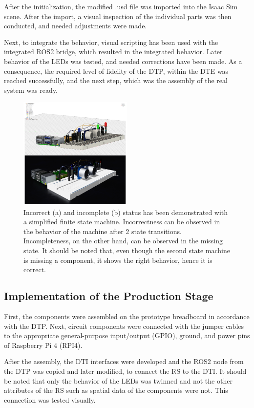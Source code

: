 \documentclass[conference]{IEEEtran}
\begin{document}
    After the initialization, the modified .usd file was imported into the Isaac Sim scene. After the import, a visual inspection of the individual 
    parts was then conducted, and needed adjustments were made. 

    Next, to integrate the behavior, visual scripting has been used with the integrated ROS2 bridge, which resulted in the integrated behavior. 
    Later behavior of the LEDs was tested, and needed corrections have been made. As a consequence, the required level of fidelity of the DTP, within the DTE 
    was reached successfully, and the next step, which was the assembly of the real system was ready.

    
    \begin{figure}[htbp]
        \centering
        \includegraphics[width=0.5\textwidth]{Left.png}
        \caption{Incorrect (a) and incomplete (b) status has been demonstrated with a simplified finite state machine. Incorrectness can be observed in the behavior 
        of the machine after 2 state transitions. Incompleteness, on the other hand, can be observed in the missing state. It should be noted that, even though the second state machine is missing a 
        component, it shows the right behavior, hence it is correct.}\label{fig:Left}
    \end{figure}

    \subsection{Implementation of the Production Stage}
    First, the components were assembled on the prototype breadboard in accordance with the DTP. Next, circuit components were connected with the jumper cables to the appropriate general-purpose input/output (GPIO), ground, and power pins of Raspberry Pi 4 (RPI4). 

    After the assembly, the DTI interfaces were developed and the ROS2 node from the DTP was copied and later modified, to connect the RS to the DTI. It should be noted that only the behavior of the LEDs was twinned and not the other attributes of the RS such as spatial data of the components were not. This connection was tested visually. 
\end{document}
